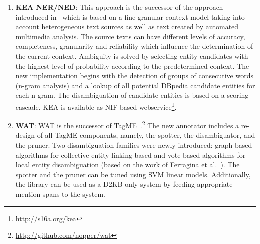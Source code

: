 \begin{enumerate}
\item \textbf{KEA NER/NED}: This approach is the successor of the approach introduced in~\cite{Steinmetz2013} which is based on a fine-granular context model taking into account heterogeneous text sources %
as well as text created by automated multimedia analysis. %
The source texts can have different levels of accuracy, completeness, granularity and reliability which influence the determination of the current context. 
Ambiguity is solved by selecting entity candidates with the highest level of probability according to the predetermined context. 
The new implementation begins with the detection of groups of consecutive words (n-gram analysis) and a lookup of all potential DBpedia candidate entities for each n-gram. 
The disambiguation of candidate entities is based on a scoring cascade. %
KEA is available as NIF-based webservice\footnote{\url{http://s16a.org/kea}}.


\item \textbf{WAT}: WAT is the successor of TagME~\cite{TagMe2}.\footnote{\url{http://github.com/nopper/wat}}
The new annotator includes a re-design of all TagME components, namely, the spotter, the disambiguator, and the pruner. 
Two disambiguation families were newly introduced: graph-based algorithms for collective entity linking based %
and vote-based algorithms for local entity disambiguation (based on the work of Ferragina et al.~\cite{TagMe2}). 
The spotter and the pruner can be tuned using SVM linear models. 
Additionally, the library can be used as a D2KB-only system by feeding appropriate mention spans to the system. 


\end{enumerate}
